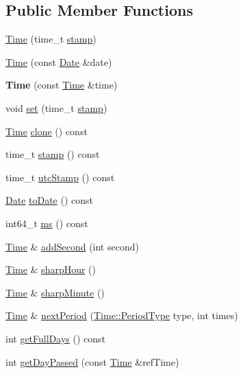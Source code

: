 \subsection*{Public Member Functions}
\begin{DoxyCompactItemize}
\item 
\hyperlink{classec_1_1Time_ad71ce055dce14e6adbe3f1706c21f1ec}{Time} (time\-\_\-t \hyperlink{classec_1_1Time_a01d690a321ce3cdc18dc627761300c44}{stamp})
\item 
\hyperlink{classec_1_1Time_a20f81005d631383e457a8032517fdf26}{Time} (const \hyperlink{classec_1_1Date}{Date} \&date)
\item 
\hypertarget{classec_1_1Time_aea3741d25cd28cb6322f17da7f3b4b70}{{\bfseries Time} (const \hyperlink{classec_1_1Time}{Time} \&time)}\label{classec_1_1Time_aea3741d25cd28cb6322f17da7f3b4b70}

\item 
void \hyperlink{classec_1_1Time_a649973da162f122234542498d17cfa5f}{set} (time\-\_\-t \hyperlink{classec_1_1Time_a01d690a321ce3cdc18dc627761300c44}{stamp})
\item 
\hyperlink{classec_1_1Time}{Time} \hyperlink{classec_1_1Time_a3abe7344a991a11875c565beb31c099f}{clone} () const 
\item 
time\-\_\-t \hyperlink{classec_1_1Time_a01d690a321ce3cdc18dc627761300c44}{stamp} () const 
\item 
time\-\_\-t \hyperlink{classec_1_1Time_ae1344f099583fe278563d3d5105025bf}{utc\-Stamp} () const 
\item 
\hyperlink{classec_1_1Date}{Date} \hyperlink{classec_1_1Time_af0bc39da85cdbf23c8513a1202d206ff}{to\-Date} () const 
\item 
int64\-\_\-t \hyperlink{classec_1_1Time_a404a498705d89d99387c67b7a70f12b9}{ms} () const 
\item 
\hyperlink{classec_1_1Time}{Time} \& \hyperlink{classec_1_1Time_afcc17c2d59e9e7cbe996a8c7ae8f9fcd}{add\-Second} (int second)
\item 
\hyperlink{classec_1_1Time}{Time} \& \hyperlink{classec_1_1Time_add5a030523e1ea07021c81628ee545f6}{sharp\-Hour} ()
\item 
\hyperlink{classec_1_1Time}{Time} \& \hyperlink{classec_1_1Time_acc1ad308e6af04151fcc85818a45936c}{sharp\-Minute} ()
\item 
\hyperlink{classec_1_1Time}{Time} \& \hyperlink{classec_1_1Time_a126a19d88d9204dabad89a540de2ef94}{next\-Period} (\hyperlink{classec_1_1Time_a5a62816a9c7f2df3ca66f54d1544ea46}{Time\-::\-Period\-Type} type, int times)
\item 
int \hyperlink{classec_1_1Time_a672781d41bfac66415d3f91bbea6f453}{get\-Full\-Days} () const 
\item 
int \hyperlink{classec_1_1Time_a3e049ae0ad518e44d72e86172f16e15d}{get\-Day\-Passed} (const \hyperlink{classec_1_1Time}{Time} \&ref\-Time)
\end{DoxyCompactItemize}
